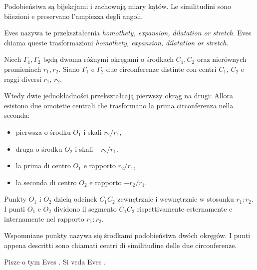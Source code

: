 Podobieństwa są bijekcjami i zachowują miary kątów. %
Le similitudini sono biiezioni e preservano l'ampiezza degli angoli. %

Eves \cite[s. 105]{eves1_1972} nazywa te przekształcenia \emph{homothety, expansion, dilatation or stretch}. %
Eves \cite[p.~105]{eves1_1972} chiama queste trasformazioni \emph{homothety, expansion, dilatation or stretch}. %

\begin{proposition}
    Niech $\Gamma_1, \Gamma_2$ będą dwoma różnymi okręgami o środkach $C_1, C_2$ oraz nierównych promieniach $r_1, r_2$. %
    Siano $\Gamma_1$ e $\Gamma_2$ due circonferenze distinte con centri $C_1$, $C_2$ e raggi diversi $r_1$, $r_2$. %

    Wtedy dwie jednokładności przekształcają pierwszy okrąg na drugi: %
    Allora esistono due omotetie centrali che trasformano la prima circonferenza nella seconda: %
    \begin{itemize}
    \item pierwsza o środku $O_1$ i skali $r_2/r_1$, %
    \item druga o środku $O_2$ i skali $-r_2/r_1$. %
    \item la prima di centro $O_1$ e rapporto $r_2/r_1$, %
    \item la seconda di centro $O_2$ e rapporto $-r_2/r_1$. %
    \end{itemize}

    Punkty $O_1$ i $O_2$ dzielą odcinek $C_1 C_2$ zewnętrznie i wewnętrznie w stosunku $r_1 : r_2$. %
    I punti $O_1$ e $O_2$ dividono il segmento $C_1C_2$ rispettivamente esternamente e internamente nel rapporto $r_1 : r_2$. %
\end{proposition}

Wspomniane punkty nazywa się środkami podobieństwa dwóch okręgów. %
I punti appena descritti sono chiamati centri di similitudine delle due circonferenze. %

Pisze o tym Eves \cite[s. 108]{eves1_1972}. %
Si veda Eves \cite[p.~108]{eves1_1972}. %


